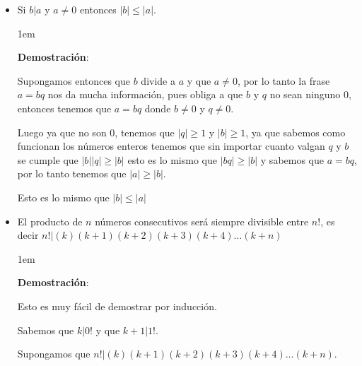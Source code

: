 \documentclass[12pt, fleqn]{report}                             %
\newenvironment{SmallIndentation}[1][0.75em]                    %
    {\begin{adjustwidth}{#1}{}\begin{footnotesize}}                 %
    {\end{footnotesize}\end{adjustwidth}}                           %
\begin{document}
\begin{itemize}
                \clearpage

                \item Si $b|a$ y $a \neq 0$ entonces $|b| \leq |a|$.

                    \begin{SmallIndentation}[1em]
                        \textbf{Demostración}:

                        Supongamos entonces que $b$ divide a $a$ y que $a \neq 0$, por lo tanto
                        la frase $a = bq$ nos da mucha información, pues obliga a que $b$ y $q$
                        no sean ninguno $0$, entonces tenemos que $a = bq$ donde $b \neq 0$ y 
                        $q \neq 0$.

                        Luego ya que no son 0, tenemos que $|q| \geq 1$ y $|b| \geq 1$, ya que sabemos
                        como funcionan los números enteros tenemos que sin importar cuanto valgan $q$ y $b$
                        se cumple que $|b||q| \geq |b|$ esto es lo mismo que $|bq| \geq |b|$ y sabemos que
                        $a = bq$, por lo tanto tenemos que $|a| \geq |b|$.

                        Esto es lo mismo que $|b| \leq |a|$

                    \end{SmallIndentation}


                \item El producto de $n$ números consecutivos será siempre divisible entre
                $n!$, es decir $n! | (k)(k+1)(k+2)(k+3)(k+4)\dots(k+n)$

                    \begin{SmallIndentation}[1em]
                        \textbf{Demostración}:

                        Esto es muy fácil de demostrar por inducción.

                        Sabemos que $k|0!$ y que $k+1|1!$.

                        Supongamos que $n! | (k)(k+1)(k+2)(k+3)(k+4)\dots(k+n)$.


\end{SmallIndentation}
\end{itemize}
\end{document}
